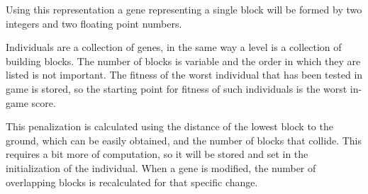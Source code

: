 \documentclass[runningheads,a4paper]{llncs}
\begin{document}
Using this representation a gene representing a single block will be formed by two integers and two floating point numbers.


Individuals are a collection of genes, in the same way a level is a collection 
of building blocks. The number of blocks is variable and the order in which 
they are listed is not important. 
The fitness of the worst individual that has been tested in game is
stored, so
the starting point for fitness of such individuals is the 
worst in-game score.

This penalization is calculated using the distance of the lowest block to the 
ground, which can be easily obtained, and the number of blocks that collide. 
This requires a bit more of computation, so it will be stored and set in the 
initialization of the individual. When a gene is modified, the number of 
overlapping blocks is recalculated for that specific change.

\end{document}
